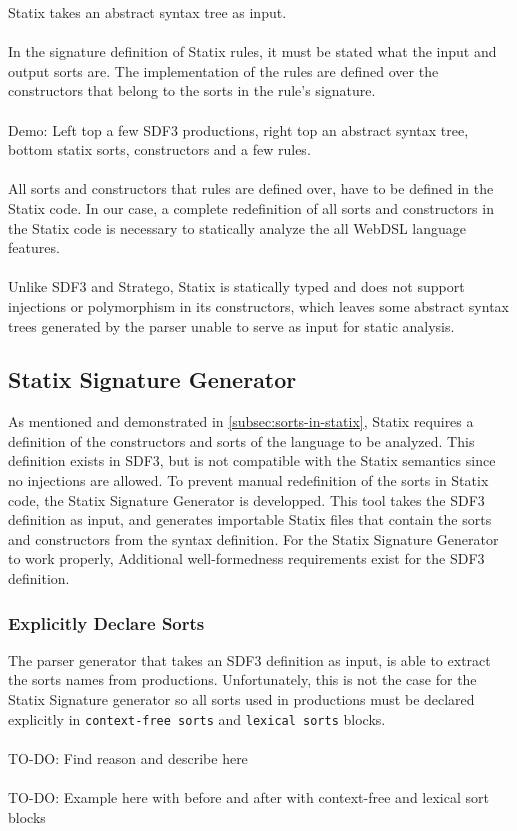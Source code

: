       Statix takes an abstract syntax tree as input.
      \\\\In the signature definition of Statix rules, it must be stated what the input and output sorts are. The implementation of the rules are defined over the constructors that belong to the sorts in the rule's signature.
      \\\\Demo: Left top a few SDF3 productions, right top an abstract syntax tree, bottom statix sorts, constructors and a few rules.
      \\\\All sorts and constructors that rules are defined over, have to be defined in the Statix code. In our case, a complete redefinition of all sorts and constructors in the Statix code is necessary to statically analyze the all WebDSL language features.
      \\\\Unlike SDF3 and Stratego, Statix is statically typed and does not support injections or polymorphism in its constructors, which leaves some abstract syntax trees generated by the parser unable to serve as input for static analysis.

    \subsection{\label{subsec:statix-signature-generator}Statix Signature Generator}

      As mentioned and demonstrated in \cref{subsec:sorts-in-statix}, Statix requires a definition of the constructors and sorts of the language to be analyzed. This definition exists in SDF3, but is not compatible with the Statix semantics since no injections are allowed. To prevent manual redefinition of the sorts in Statix code, the Statix Signature Generator is developped. This tool takes the SDF3 definition as input, and generates importable Statix files that contain the sorts and constructors from the syntax definition. For the Statix Signature Generator to work properly, Additional well-formedness requirements exist for the SDF3 definition.

      \subsubsection{Explicitly Declare Sorts}

        The parser generator that takes an SDF3 definition as input, is able to extract the sorts names from productions. Unfortunately, this is not the case for the Statix Signature generator so all sorts used in productions must be declared explicitly in \texttt{context-free sorts} and \texttt{lexical sorts} blocks.
        \\\\TO-DO: Find reason and describe here
        \\\\TO-DO: Example here with before and after with context-free and lexical sort blocks

